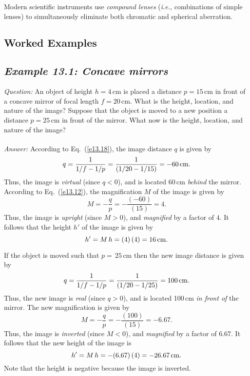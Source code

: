Modern scientific instruments use {\em compound lenses} ({\em i.e.},
combinations of simple lenses) to simultaneously
 eliminate both chromatic and
spherical aberration. 

\subsection{Worked Examples}
\subsection*{\em Example 13.1: Concave mirrors}
{\em Question:} An object of height $h=4$\,cm is placed
a distance $p=15$\,cm in front of a concave mirror of
focal length $f=20$\,cm. What is the height, location, and
nature of the image? Suppose that the object is
moved to a new position a distance $p=25$\,{\rm cm} in front
of the mirror. What now is the height, location, and
nature of the image? \\
~\\
{\em Answer:} According to Eq.~(\ref{e13.18}), the image distance $q$ is
given by
$$
q = \frac{1}{1/f - 1/p} = \frac{1}{(1/20-1/15)} = - 60\,{\rm cm}.
$$
Thus, the image is {\em virtual} (since $q<0$), and is located $60$\,cm {\em behind}
the mirror. According to Eq.~(\ref{e13.12}), the magnification $M$ of
the image is given by
$$
M = -\frac{q}{p} = -\frac{(-60)}{(15)} = 4.
$$
Thus, the image is {\em upright}\/ (since $M>0$), and
{\em magnified}\/ by a factor of $4$. It follows that the height 
$h'$ of
the image is given by 
$$ 
h' = M\,h = (4)\,(4) = 16\,{\rm cm}.
$$

If the object is moved such that $p=\,25$\,{\rm cm} then the
new image distance is given by
$$
q = \frac{1}{1/f - 1/p} = \frac{1}{(1/20-1/25)} = 100\,{\rm cm}.
$$
Thus, the new image is {\em real}\/ (since $q>0$), and is
located 100\,{\rm cm} {\em in front of} the mirror. The new magnification is
given by
$$
M = -\frac{q}{p} = -\frac{(100)}{(15)} = -6.67.
$$
Thus, the image is {\em inverted}\/ (since $M<0$), and
{\em magnified}\/ by a factor of $6.67$. It follows that the
new height of the image
is
$$ 
h' = M\,h = -(6.67)\,(4) = -26.67\,{\rm cm}.
$$
Note that the height is negative because the image is inverted.

